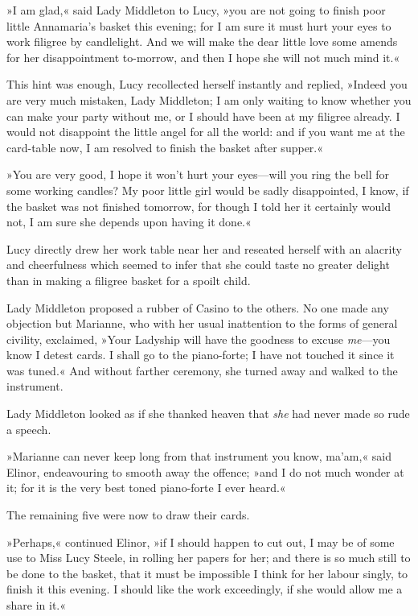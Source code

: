 »I am glad,« said Lady Middleton to Lucy, »you are not going to finish poor little Annamaria’s basket this evening; for I am sure it must hurt your eyes to work filigree by candlelight. And we will make the dear little love some amends for her disappointment to-morrow, and then I hope she will not much mind it.«

This hint was enough, Lucy recollected herself instantly and replied, »Indeed you are very much mistaken, Lady Middleton; I am only waiting to know whether you can make your party without me, or I should have been at my filigree already. I would not disappoint the little angel for all the world: and if you want me at the card-table now, I am resolved to finish the basket after supper.«

»You are very good, I hope it won’t hurt your eyes—will you ring the bell for some working candles? My poor little girl would be sadly disappointed, I know, if the basket was not finished tomorrow, for though I told her it certainly would not, I am sure she depends upon having it done.«

Lucy directly drew her work table near her and reseated herself with an alacrity and cheerfulness which seemed to infer that she could taste no greater delight than in making a filigree basket for a spoilt child.

Lady Middleton proposed a rubber of Casino to the others. No one made any objection but Marianne, who with her usual inattention to the forms of general civility, exclaimed, »Your Ladyship will have the goodness to excuse \textit{me}—you know I detest cards. I shall go to the piano-forte; I have not touched it since it was tuned.« And without farther ceremony, she turned away and walked to the instrument.

Lady Middleton looked as if she thanked heaven that \textit{she} had never made so rude a speech.

»Marianne can never keep long from that instrument you know, ma’am,« said Elinor, endeavouring to smooth away the offence; »and I do not much wonder at it; for it is the very best toned piano-forte I ever heard.«

The remaining five were now to draw their cards.

»Perhaps,« continued Elinor, »if I should happen to cut out, I may be of some use to Miss Lucy Steele, in rolling her papers for her; and there is so much still to be done to the basket, that it must be impossible I think for her labour singly, to finish it this evening. I should like the work exceedingly, if she would allow me a share in it.«

